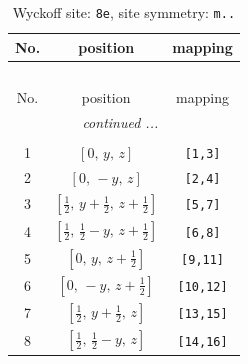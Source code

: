 \documentclass[fleqn,8pt]{jsarticle}
\begin{document}
\begin{longtable}{ccc}
\caption{Wyckoff site: {\tt 8e}, site symmetry: {\tt m..}}
 \\
 \hline \hline
No. & position & mapping \\ \hline \endfirsthead

\multicolumn{2}{l}{\tablename\ \thetable{}} \\
 \hline \hline
No. & position & mapping \\ \hline \endhead

 \hline \hline
\multicolumn{2}{r}{\footnotesize\it continued ...} \\ \endfoot

 \hline \hline
\multicolumn{2}{r}{} \\ \endlastfoot

1 & $\left[ 0,\, y,\, z \right]$ & {\tt [1,3]} \\ \hline
2 & $\left[ 0,\, - y,\, z \right]$ & {\tt [2,4]} \\ \hline
3 & $\left[ \frac{1}{2},\, y + \frac{1}{2},\, z + \frac{1}{2} \right]$ & {\tt [5,7]} \\ \hline
4 & $\left[ \frac{1}{2},\, \frac{1}{2} - y,\, z + \frac{1}{2} \right]$ & {\tt [6,8]} \\ \hline
5 & $\left[ 0,\, y,\, z + \frac{1}{2} \right]$ & {\tt [9,11]} \\ \hline
6 & $\left[ 0,\, - y,\, z + \frac{1}{2} \right]$ & {\tt [10,12]} \\ \hline
7 & $\left[ \frac{1}{2},\, y + \frac{1}{2},\, z \right]$ & {\tt [13,15]} \\ \hline
8 & $\left[ \frac{1}{2},\, \frac{1}{2} - y,\, z \right]$ & {\tt [14,16]} \\
\end{longtable}
\renewcommand{\arraystretch}{1.2}
\end{document}
